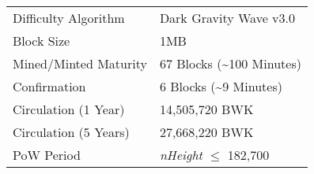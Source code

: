 \documentclass[11pt,a4paperpaper,]{report}
\begin{document}
\begin{longtable}[c]{@{}ll@{}}
\begin{minipage}[t]{0.35\columnwidth}\raggedright\strut
Difficulty Algorithm
\strut\end{minipage} &
\begin{minipage}[t]{0.59\columnwidth}\raggedright\strut
Dark Gravity Wave v3.0
\strut\end{minipage}\tabularnewline
\begin{minipage}[t]{0.35\columnwidth}\raggedright\strut
Block Size
\strut\end{minipage} &
\begin{minipage}[t]{0.59\columnwidth}\raggedright\strut
1MB
\strut\end{minipage}\tabularnewline
\begin{minipage}[t]{0.35\columnwidth}\raggedright\strut
Mined/Minted Maturity
\strut\end{minipage} &
\begin{minipage}[t]{0.59\columnwidth}\raggedright\strut
67 Blocks (\textasciitilde{}100 Minutes)
\strut\end{minipage}\tabularnewline
\begin{minipage}[t]{0.35\columnwidth}\raggedright\strut
Confirmation
\strut\end{minipage} &
\begin{minipage}[t]{0.59\columnwidth}\raggedright\strut
6 Blocks (\textasciitilde{}9 Minutes)
\strut\end{minipage}\tabularnewline
\begin{minipage}[t]{0.35\columnwidth}\raggedright\strut
Circulation (1 Year)
\strut\end{minipage} &
\begin{minipage}[t]{0.59\columnwidth}\raggedright\strut
14,505,720 BWK
\strut\end{minipage}\tabularnewline
\begin{minipage}[t]{0.35\columnwidth}\raggedright\strut
Circulation (5 Years)
\strut\end{minipage} &
\begin{minipage}[t]{0.59\columnwidth}\raggedright\strut
27,668,220 BWK
\strut\end{minipage}\tabularnewline
\begin{minipage}[t]{0.35\columnwidth}\raggedright\strut
PoW Period
\strut\end{minipage} &
\begin{minipage}[t]{0.59\columnwidth}\raggedright\strut
\textit{nHeight} \(\leq\) 182,700
\strut\end{minipage}\tabularnewline

\end{longtable}
\end{document}
